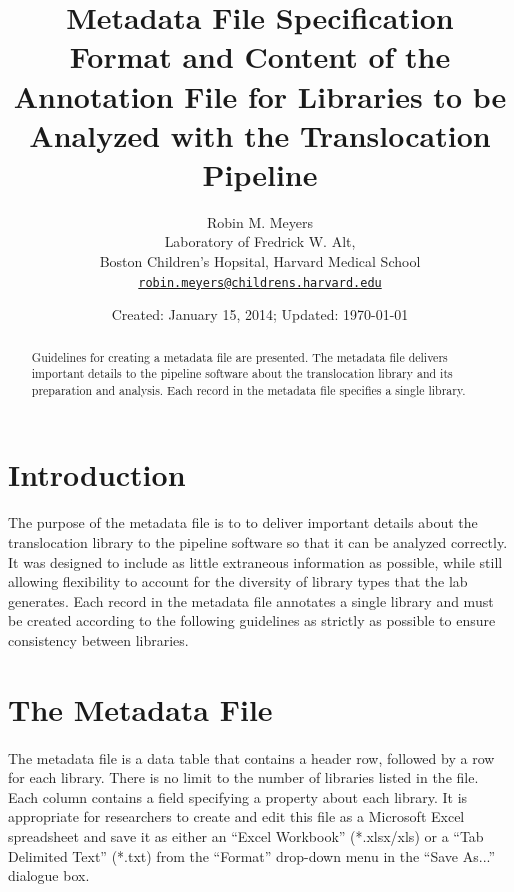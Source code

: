 \documentclass{article}
\begin{document}
\title{Metadata File Specification \\ \large Format and Content of the Annotation File for Libraries to be Analyzed with the Translocation Pipeline}
\author{Robin M. Meyers\\
  Laboratory of Fredrick W. Alt,\\
  Boston Children's Hopsital, Harvard Medical School\\
  \href{mailto:robin.meyers@childrens.harvard.edu}{\texttt{robin.meyers@childrens.harvard.edu}}}
\date{Created: January 15, 2014; Updated: \today}
\maketitle

\begin{abstract}
Guidelines for creating a metadata file are presented. The metadata file delivers important details to the pipeline software about the translocation library and its preparation and analysis. Each record in the metadata file specifies a single library.
\end{abstract}

\section{Introduction}
\paragraph{}
The purpose of the metadata file is to to deliver important details about the translocation library to the pipeline software so that it can be analyzed correctly. It was designed to include as little extraneous information as possible, while still allowing flexibility to account for the diversity of library types that the lab generates. Each record in the metadata file annotates a single library and must be created according to the following guidelines as strictly as possible to ensure consistency between libraries.

\section{The Metadata File}
\paragraph{} The metadata file is a data table that contains a header row, followed by a row for each library. There is no limit to the number of libraries listed in the file. Each column contains a field specifying a property about each library. It is appropriate for researchers to create and edit this file as a Microsoft Excel spreadsheet and save it as either an ``Excel Workbook'' (*.xlsx/xls) or a ``Tab Delimited Text'' (*.txt) from the ``Format'' drop-down menu in the ``Save As...'' dialogue box.  
\end{document}
